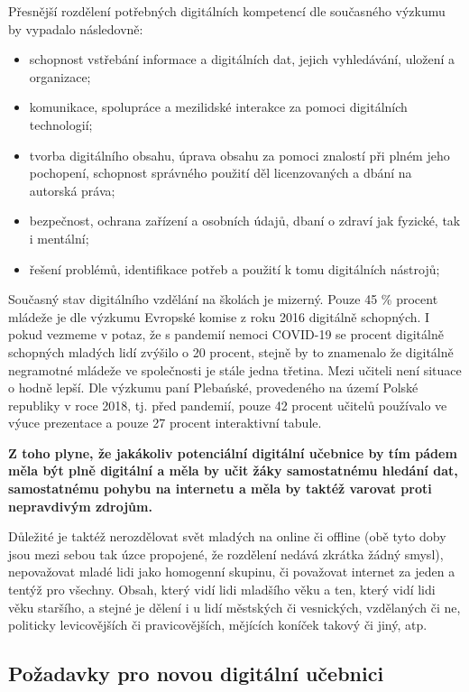 \documentclass[12pt]{article}
\begin{document}
Přesnější rozdělení potřebných digitálních kompetencí dle současného výzkumu by vypadalo následovně:
\begin{itemize}
	\item {} schopnost vstřebání informace a digitálních dat, jejich vyhledávání, uložení a organizace;
	\item {} komunikace, spolupráce a mezilidské interakce za pomoci digitálních technologií;
	\item {} tvorba digitálního obsahu, úprava obsahu za pomoci znalostí při plném jeho pochopení, schopnost správného použití děl licenzovaných a dbání na autorská práva;
	\item {} bezpečnost, ochrana zařízení a osobních údajů, dbaní o zdraví jak fyzické, tak i mentální;
	\item {} řešení problémů, identifikace potřeb a použití k tomu digitálních nástrojů;
\end{itemize}

Současný stav digitálního vzdělání na školách je mizerný. Pouze 45 \% procent mládeže je dle výzkumu Evropské komise z roku 2016 digitálně schopných. I pokud vezmeme v potaz, že s pandemií nemoci COVID-19 se procent digitálně schopných mladých lidí zvýšilo o 20 procent, stejně by to znamenalo že digitálně negramotné mládeže ve společnosti je stále jedna třetina. Mezi učiteli není situace o hodně lepší. Dle výzkumu paní Plebańské, provedeného na území Polské republiky v roce 2018, tj. před pandemií, pouze 42 procent učitelů používalo ve výuce prezentace a pouze 27 procent interaktivní tabule.

\cite{WPPdigital}

\textbf{Z toho plyne, že jakákoliv potenciální digitální učebnice by tím pádem měla být plně digitální a měla by učit žáky samostatnému hledání dat, samostatnému pohybu na internetu a měla by taktéž varovat proti nepravdivým zdrojům.}

Důležité je taktéž nerozdělovat svět mladých na online či offline (obě tyto doby jsou mezi sebou tak úzce propojené, že rozdělení nedává zkrátka žádný smysl), nepovažovat mladé lidi jako homogenní skupinu, či považovat internet za jeden a tentýž pro všechny. Obsah, který vidí lidi mladšího věku a ten, který vidí lidi věku staršího, a stejné je dělení i u lidí městských či vesnických, vzdělaných či ne, politicky levicovějších či pravicovějších, mějících koníček takový či jiný, atp.
\cite[str. 224-225]{WPPdigital}

\newpage
\subsection{Požadavky pro novou digitální učebnici}
\end{document}
